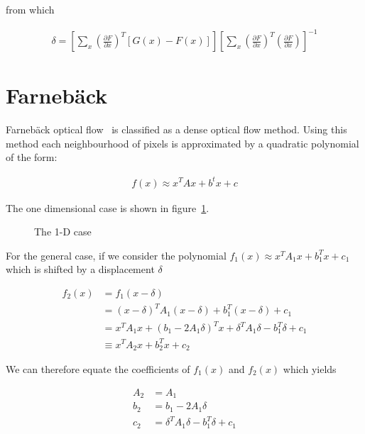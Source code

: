 from which

\begin{align*}
  \delta = \left[\sum_{x}\left(\frac{\partial F}{\partial x}\right)^T\left[G(x) - F(x)\right]\right]\left[\sum_{x}\left(\frac{\partial F}{\partial x}\right)^T\left(\frac{\partial F}{\partial x}\right)\right]^{-1}
\end{align*}

\section{Farnebäck}

Farnebäck optical flow~\citep{farneback} is classified as a dense optical flow method. Using this method each neighbourhood of pixels is approximated by a quadratic polynomial of the form:

\begin{align*}
f(x) \approx x^TAx+b^tx+c
\end{align*}

The one dimensional case is shown in figure~\ref{fig:farneback}.

\begin{figure}[h]
  \centering
  \caption{The 1-D case}
  \label{fig:farneback}
\end{figure}

For the general case, if we consider the polynomial $f_1(x) \approx x^TA_1x+b_1^Tx+c_1$ which is shifted by a displacement $\delta$

\begin{align*}
f_2(x) &= f_1(x-\delta) \\
&= (x-\delta)^T A_1 (x-\delta) + b_1^T (x-\delta) + c_1 \\
&= x^TA_1x + (b_1 - 2A_1\delta)^Tx + \delta^TA_1\delta -b_1^T\delta + c_1 \\
&\equiv x^TA_2x + b_2^Tx + c_2
\end{align*}

We can therefore equate the coefficients of $f_1(x)$ and $f_2(x)$ which yields

\begin{align*}
A_2 &= A_1 \\
b_2 &= b_1 - 2A_1\delta \\
c_2 &= \delta^TA_1\delta - b_1^T\delta + c_1
\end{align*}

